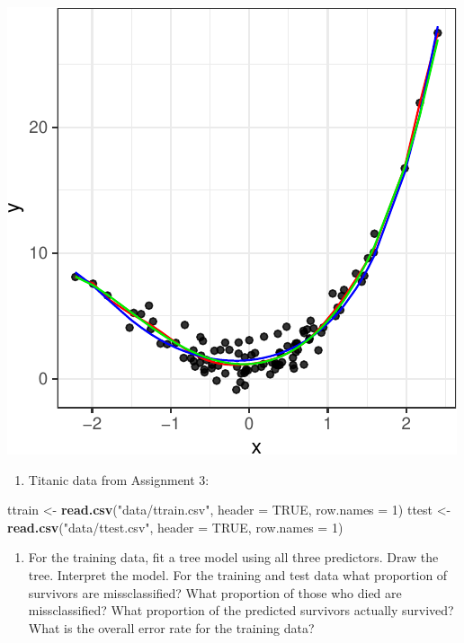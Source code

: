\documentclass[]{article}
\newenvironment{Shaded}{\begin{snugshade}}{\end{snugshade}}
\newcommand{\DataTypeTok}[1]{\textcolor[rgb]{0.13,0.29,0.53}{#1}}
\newcommand{\DecValTok}[1]{\textcolor[rgb]{0.00,0.00,0.81}{#1}}
\newcommand{\KeywordTok}[1]{\textcolor[rgb]{0.13,0.29,0.53}{\textbf{#1}}}
\newcommand{\NormalTok}[1]{#1}
\newcommand{\OtherTok}[1]{\textcolor[rgb]{0.56,0.35,0.01}{#1}}
\newcommand{\StringTok}[1]{\textcolor[rgb]{0.31,0.60,0.02}{#1}}
\providecommand{\tightlist}{%
  \setlength{\itemsep}{0pt}\setlength{\parskip}{0pt}}
\begin{document}
\begin{center}\includegraphics{sol_A4_files/figure-latex/unnamed-chunk-18-1} \end{center}

\begin{enumerate}
\def\labelenumi{\arabic{enumi}.}
\setcounter{enumi}{5}
\tightlist
\item
  Titanic data from Assignment 3:
\end{enumerate}

\begin{Shaded}
\begin{Highlighting}[]
\NormalTok{ttrain <-}\StringTok{ }\KeywordTok{read.csv}\NormalTok{(}\StringTok{"data/ttrain.csv"}\NormalTok{, }\DataTypeTok{header =} \OtherTok{TRUE}\NormalTok{, }\DataTypeTok{row.names =} \DecValTok{1}\NormalTok{)}
\NormalTok{ttest <-}\StringTok{ }\KeywordTok{read.csv}\NormalTok{(}\StringTok{"data/ttest.csv"}\NormalTok{, }\DataTypeTok{header =} \OtherTok{TRUE}\NormalTok{, }\DataTypeTok{row.names =} \DecValTok{1}\NormalTok{)}
\end{Highlighting}
\end{Shaded}

\begin{enumerate}
\def\labelenumi{(\alph{enumi})}
\tightlist
\item
  For the training data, fit a tree model using all three predictors.
  Draw the tree. Interpret the model. For the training and test data
  what proportion of survivors are missclassified? What proportion of
  those who died are missclassified? What proportion of the predicted
  survivors actually survived? What is the overall error rate for the
  training data?
\end{enumerate}
\end{document}
